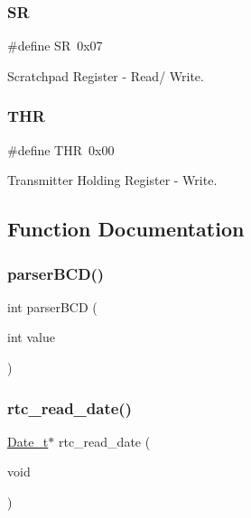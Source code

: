 \hypertarget{group___serial_gabaed93a16a0cde13f32bc4dc48b96804}{}\label{group___serial_gabaed93a16a0cde13f32bc4dc48b96804} 
\subsubsection{\texorpdfstring{SR}{SR}}
{\footnotesize\ttfamily \#define SR~0x07}



Scratchpad Register -\/ Read/ Write. 

\hypertarget{group___serial_ga5e9787adf3c9afcc4b781e85bb545b35}{}\label{group___serial_ga5e9787adf3c9afcc4b781e85bb545b35} 
\subsubsection{\texorpdfstring{T\+HR}{THR}}
{\footnotesize\ttfamily \#define T\+HR~0x00}



Transmitter Holding Register -\/ Write. 



\subsection{Function Documentation}
\hypertarget{group___serial_gab77fc689b79cf1fa098f71a4ff5abdeb}{}\label{group___serial_gab77fc689b79cf1fa098f71a4ff5abdeb} 
\subsubsection{\texorpdfstring{parser\+B\+C\+D()}{parserBCD()}}
{\footnotesize\ttfamily int parser\+B\+CD (\begin{DoxyParamCaption}\item[{int}]{value }\end{DoxyParamCaption})}

\hypertarget{group___serial_ga08a02c163edf9dc74b2d15dfb23a2624}{}\label{group___serial_ga08a02c163edf9dc74b2d15dfb23a2624} 
\subsubsection{\texorpdfstring{rtc\+\_\+read\+\_\+date()}{rtc\_read\_date()}}
{\footnotesize\ttfamily \hyperlink{struct_date__t}{Date\+\_\+t}$\ast$ rtc\+\_\+read\+\_\+date (\begin{DoxyParamCaption}\item[{void}]{ }\end{DoxyParamCaption})}

